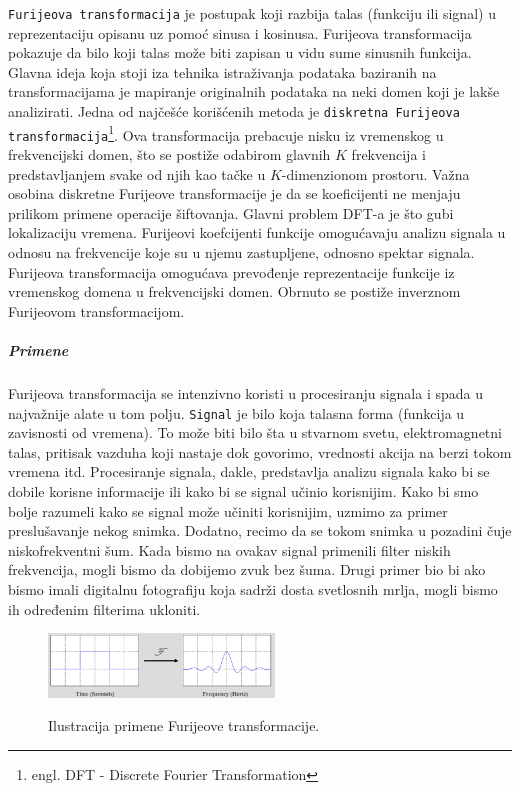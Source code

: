 \documentclass[a4paper]{article}
\begin{document}
\texttt{Furijeova transformacija} je postupak koji razbija talas (funkciju ili signal) u reprezentaciju opisanu uz pomoć sinusa i kosinusa. Furijeova transformacija pokazuje da bilo koji talas može biti zapisan u vidu sume sinusnih funkcija. Glavna ideja koja stoji iza tehnika istraživanja podataka baziranih na transformacijama je mapiranje originalnih podataka na neki domen koji je lakše analizirati. Jedna od najčešće korišćenih metoda je \texttt{diskretna Furijeova transformacija}\footnote{engl. DFT - Discrete Fourier Transformation}. Ova transformacija prebacuje nisku iz vremenskog u frekvencijski domen, što se postiže odabirom glavnih $K$ frekvencija i predstavljanjem svake od njih kao tačke u $K$-dimenzionom prostoru. Važna osobina diskretne Furijeove transformacije je da se koeficijenti ne menjaju prilikom primene operacije šiftovanja. Glavni problem DFT-a je što gubi lokalizaciju vremena. Furijeovi koefcijenti funkcije omogućavaju analizu signala u odnosu na frekvencije koje su u njemu zastupljene, odnosno spektar signala. Furijeova transformacija omogućava prevođenje reprezentacije funkcije iz vremenskog domena u 
frekvencijski domen. Obrnuto se postiže inverznom Furijeovom transformacijom. \\

\subparagraph{Primene} Furijeova transformacija se intenzivno koristi u procesiranju signala i spada u najvažnije alate u tom polju. \texttt{Signal} je bilo koja talasna forma (funkcija u zavisnosti od vremena). To može biti bilo šta u stvarnom svetu, elektromagnetni talas, pritisak vazduha koji nastaje dok govorimo, vrednosti akcija na berzi tokom vremena itd. Procesiranje signala, dakle, predstavlja analizu signala kako bi se dobile korisne informacije ili kako bi se signal učinio korisnijim. Kako bi smo bolje razumeli kako se signal može učiniti korisnijim, uzmimo za primer preslušavanje nekog snimka. Dodatno, recimo da se tokom snimka u pozadini čuje niskofrekventni šum. Kada bismo na ovakav signal primenili filter niskih frekvencija, mogli bismo da dobijemo zvuk bez šuma. Drugi primer bio bi ako bismo imali digitalnu fotografiju koja sadrži dosta svetlosnih mrlja, mogli bismo ih određenim filterima ukloniti. \\

\begin{figure}[t]
\includegraphics[width=6cm]{Pictures/fourier2.png}
\centering
\label{fig:fourier2}
\caption{Ilustracija primene Furijeove transformacije.}
\end{figure}
\end{document}
